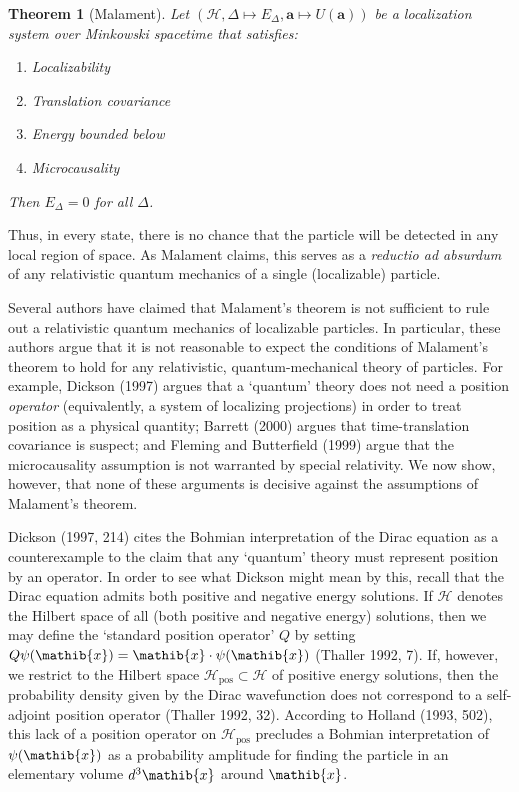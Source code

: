 \documentclass[11pt]{article}
\newtheorem*{thm*}{Theorem}
\theoremstyle{remark}
\newcommand{\hil}[1]{\mathcal{#1}}
\begin{document}
\begin{thm*}[Malament] Let $(\hil{H},\Delta \mapsto
  E_{\Delta},\mathbf{a}\mapsto U(\mathbf{a}))$ be a localization
  system over Minkowski spacetime that satisfies:
\begin{enumerate} 
\item Localizability
\item Translation covariance
\item Energy bounded below
\item Microcausality
\end{enumerate} Then $E_{\Delta}=0$ for all
$\Delta$.  \label{malament} \end{thm*}
\noindent Thus, in every state, there is no chance that the particle
will be detected in any local region of space.  As Malament claims,
this serves as a \emph{reductio ad absurdum} of any relativistic
quantum mechanics of a single (localizable) particle.

Several authors have claimed that Malament's theorem is not sufficient
to rule out a relativistic quantum mechanics of localizable particles.
In particular, these authors argue that it is not reasonable to expect
the conditions of Malament's theorem to hold for any relativistic,
quantum-mechanical theory of particles.  For example, Dickson (1997)
argues that a `quantum' theory does not need a position
\emph{operator} (equivalently, a system of localizing projections) in
order to treat position as a physical quantity; Barrett (2000) argues
that time-translation covariance is suspect; and Fleming and
Butterfield (1999) argue that the microcausality assumption is not
warranted by special relativity.  We now show, however, that none of
these arguments is decisive against the assumptions of Malament's
theorem.

Dickson (1997, 214) cites the Bohmian interpretation of the Dirac
equation as a counterexample to the claim that any `quantum' theory
must represent position by an operator.  In order to see what Dickson
might mean by this, recall that the Dirac equation admits both
positive and negative energy solutions.  If $\hil{H}$ denotes the
Hilbert space of all (both positive and negative energy) solutions,
then we may define the `standard position operator' $Q$ by setting
$Q\psi (\mathib{x})=\mathib{x}\cdot \psi (\mathib{x})$ (Thaller 1992,
7).  If, however, we restrict to the Hilbert space
$\hil{H}_{\mathrm{pos}}\subset \hil{H}$ of positive energy solutions,
then the probability density given by the Dirac wavefunction does not
correspond to a self-adjoint position operator (Thaller 1992, 32).
According to Holland (1993, 502), this lack of a position operator on
$\hil{H}_{\mathrm{pos}}$ precludes a Bohmian interpretation of $\psi
(\mathib{x})$ as a probability amplitude for finding the particle in
an elementary volume $d^{3}\mathib{x}$ around $\mathib{x}$.
\end{document}
